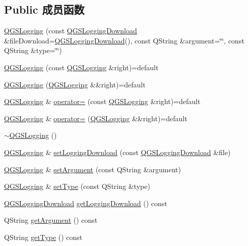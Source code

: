 \subsection*{Public 成员函数}
\begin{DoxyCompactItemize}
\item 
\mbox{\hyperlink{class_q_g_s_logging_ab992c02ed78bfb4c9ef93b1cbabf750e}{Q\+G\+S\+Logging}} (const \mbox{\hyperlink{class_q_g_s_logging_1_1_q_g_s_logging_download}{Q\+G\+S\+Logging\+Download}} \&file\+Download=\mbox{\hyperlink{class_q_g_s_logging_1_1_q_g_s_logging_download}{Q\+G\+S\+Logging\+Download}}(), const Q\+String \&argument=\char`\"{}\char`\"{}, const Q\+String \&type=\char`\"{}\char`\"{})
\item 
\mbox{\hyperlink{class_q_g_s_logging_a1083fed36fe1598b5463eb42fc65237a}{Q\+G\+S\+Logging}} (const \mbox{\hyperlink{class_q_g_s_logging}{Q\+G\+S\+Logging}} \&right)=default
\item 
\mbox{\hyperlink{class_q_g_s_logging_a601acbf9ba6bc52da8c0fe71975c82a8}{Q\+G\+S\+Logging}} (\mbox{\hyperlink{class_q_g_s_logging}{Q\+G\+S\+Logging}} \&\&right)=default
\item 
\mbox{\hyperlink{class_q_g_s_logging}{Q\+G\+S\+Logging}} \& \mbox{\hyperlink{class_q_g_s_logging_ac71452a5db13cc0218c6c1bf49250d64}{operator=}} (const \mbox{\hyperlink{class_q_g_s_logging}{Q\+G\+S\+Logging}} \&right)=default
\item 
\mbox{\hyperlink{class_q_g_s_logging}{Q\+G\+S\+Logging}} \& \mbox{\hyperlink{class_q_g_s_logging_a572d40bc91794be005fc7e2378a72f06}{operator=}} (\mbox{\hyperlink{class_q_g_s_logging}{Q\+G\+S\+Logging}} \&\&right)=default
\item 
\mbox{\hyperlink{class_q_g_s_logging_a14129b89a6fe465e044b646722724dbb}{$\sim$\+Q\+G\+S\+Logging}} ()
\item 
\mbox{\hyperlink{class_q_g_s_logging}{Q\+G\+S\+Logging}} \& \mbox{\hyperlink{class_q_g_s_logging_a82a76579905dd61f630056a054fff577}{set\+Logging\+Download}} (const \mbox{\hyperlink{class_q_g_s_logging_1_1_q_g_s_logging_download}{Q\+G\+S\+Logging\+Download}} \&file)
\item 
\mbox{\hyperlink{class_q_g_s_logging}{Q\+G\+S\+Logging}} \& \mbox{\hyperlink{class_q_g_s_logging_a54c4e2c0b4cfaa12aca4d4666ae9ce67}{set\+Argument}} (const Q\+String \&argument)
\item 
\mbox{\hyperlink{class_q_g_s_logging}{Q\+G\+S\+Logging}} \& \mbox{\hyperlink{class_q_g_s_logging_ac432aac0f9c0ae89a4987dd9ce345ba3}{set\+Type}} (const Q\+String \&type)
\item 
\mbox{\hyperlink{class_q_g_s_logging_1_1_q_g_s_logging_download}{Q\+G\+S\+Logging\+Download}} \mbox{\hyperlink{class_q_g_s_logging_a7bf4a98e0fa0ca64dad9f0498f5588f2}{get\+Logging\+Download}} () const
\item 
Q\+String \mbox{\hyperlink{class_q_g_s_logging_a0f69451e8b0bb9c78d3f9858be66fc44}{get\+Argument}} () const
\item 
Q\+String \mbox{\hyperlink{class_q_g_s_logging_ac5b7e93789940e5e4d6b3b641019bb4e}{get\+Type}} () const
\end{DoxyCompactItemize}


